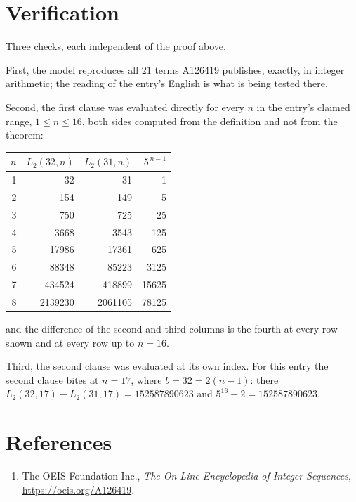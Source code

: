 \documentclass[11pt,a4paper]{article}
\theoremstyle{plain}
\theoremstyle{definition}
\begin{document}
\section{Verification}

Three checks, each independent of the proof above.

First, the model reproduces all $21$ terms A126419 publishes, exactly, in integer
arithmetic; the reading of the entry's English is what is being tested there.

Second, the first clause was evaluated directly for every $n$ in the entry's claimed range,
$1\le n\le16$, both sides computed from the definition and not from the theorem:

\begin{center}
\begin{tabular}{rrrr}
$n$ & $L_{2}(32,n)$ & $L_{2}(31,n)$ & $5^{\,n-1}$ \\ \hline
1 & 32 & 31 & 1 \\
2 & 154 & 149 & 5 \\
3 & 750 & 725 & 25 \\
4 & 3668 & 3543 & 125 \\
5 & 17986 & 17361 & 625 \\
6 & 88348 & 85223 & 3125 \\
7 & 434524 & 418899 & 15625 \\
8 & 2139230 & 2061105 & 78125 \\
\end{tabular}
\end{center}

\noindent and the difference of the second and third columns is the fourth at every row shown
and at every row up to $n=16$.

Third, the second clause was evaluated at its own index. For this entry the second clause bites at $n=17$, where $b=32=2(n-1)$: there $L_{2}(32,17)-L_{2}(31,17)=152587890623$ and $5^{16}-2=152587890623$.

\section*{References}
\begin{enumerate}
\item The OEIS Foundation Inc., \emph{The On-Line Encyclopedia of Integer Sequences},
\url{https://oeis.org/A126419}.
\end{enumerate}
\end{document}
